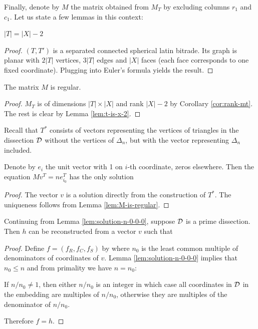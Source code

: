Finally, denote by $M$ the matrix obtained from $M_T$ by excluding columns $r_1$ and $c_1$. Let us state a few lemmas in this context:

\begin{lem}
\label{lem:t-is-x-2}
$|T| = |X|-2$
\end{lem}
\begin{proof}
$(T, T')$ is a separated connected spherical latin bitrade. Its graph is planar with $2|T|$ vertices, $3|T|$ edges and $|X|$ faces (each face corresponds to one fixed coordinate). Plugging into Euler's formula yields the result.
\end{proof}

\begin{lem}
\label{lem:M-is-regular}
The matrix $M$ is regular.
\end{lem}
\begin{proof}
$M_T$ is of dimensions $|T|\times|X|$ and rank $|X|-2$ by Corollary \ref{cor:rank-mt}. The rest is clear by Lemma \ref{lem:t-is-x-2}.
\end{proof}

Recall that $T^*$ consists of vectors representing the vertices of triangles in the dissection $\mathcal D$ without the vertices of $\Delta_n$, but with the vector representing $\Delta_n$ included.

\begin{lem}
\label{lem:solution-n-0-0-0}
Denote by $e_i$ the unit vector with 1 on $i$-th coordinate, zeros elsewhere. Then the equation $Mv^T = ne_{i_0}^T$ has the only solution
%
\end{lem}
\begin{proof}
The vector $v$ is a solution directly from the construction of $T^*$. The uniqueness follows from Lemma \ref{lem:M-is-regular}.
\end{proof}

\begin{cor}
\label{cor:solution-1-0-0-0}
Continuing from Lemma \ref{lem:solution-n-0-0-0}, suppose $\mathcal D$ is a prime dissection. Then $h$ can be reconstructed from a vector $v$ such that
%
\end{cor}
\begin{proof}
Define $f = (f_R, f_C, f_S)$ by
%
where $n_0$ is the least common multiple of denominators of coordinates of $v$. Lemma \ref{lem:solution-n-0-0-0} implies that $n_0 \leq n$ and from primality we have $n = n_0$:

If $n/n_0 \ne 1$, then either $n/n_0$ is an integer in which case all coordinates in $\mathcal D$ in the embedding are multiples of $n/n_0$, otherwise they are multiples of the denominator of $n/n_0$.

Therefore $f=h$.
\end{proof}

